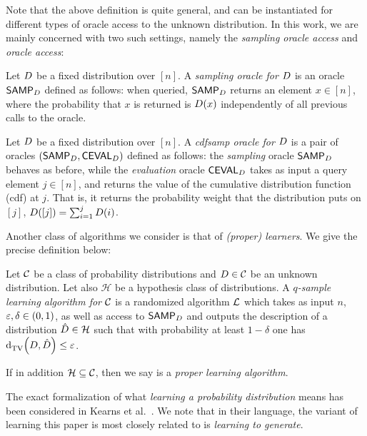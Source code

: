 Note that the above definition is quite general, and can be instantiated for different types of oracle access to the unknown distribution. In this work, we are mainly concerned with two such settings, namely the \emph{sampling oracle access} and \emph{\Cdfsamp oracle access}:
  \begin{definition}\label{def:sampling:oracle}
      Let $D$ be a fixed distribution over $[n]$. A \emph{sampling oracle for $D$} is an oracle ${\sf SAMP}_{D}$ defined as follows: when queried, ${\sf SAMP}_{D}$ returns an element $x\in[n]$, where the probability that $x$ is returned is $D(x)$ independently of all previous calls to the oracle.
  \end{definition}
    \begin{definition}\label{def:extended:oracle}
    Let $D$ be a fixed distribution over $[n]$. A \emph{cdfsamp oracle for $D$} is a pair of oracles $({\sf SAMP}_{D}, {\sf CEVAL}_{D})$ defined as follows: the \emph{sampling} oracle ${\sf SAMP}_{D}$ behaves as before, while the \emph{evaluation} oracle ${\sf CEVAL}_{D}$ takes as input a query element $j\in[n]$, and returns the value of the cumulative distribution function (cdf) at $j$. That is, it returns the probability weight that the distribution puts on $[j]$, $D([j])=\sum_{i=1}^j D(i)$.
    \end{definition}  

\noindent Another class of algorithms we consider is that of \emph{(proper) learners}. We give the precise definition below:  
\begin{definition}[Learning]
Let $\mathcal{C}$ be a class of probability distributions and $D\in \mathcal{C}$ be an unknown distribution. Let also $\mathcal{H}$ be a hypothesis class of distributions. 
A \emph{$q$-sample learning algorithm for $\mathcal{C}$} is a randomized algorithm $\mathcal{L}$ which takes as input $n$, $\varepsilon,\delta\in(0,1)$, as well as access to ${\sf SAMP}_{D}$ and  outputs the description of a distribution $\hat{D}\in \mathcal{H}$ such that with probability at least $1-\delta$ one has ${\operatorname{d}_{\textrm{TV}}^{}\!\left({D, \hat{D}}\right)}\leq \varepsilon$. 

\noindent If in addition $\mathcal{H}\subseteq \mathcal{C}$, then we say \Learner is a \emph{proper learning algorithm}.   
\end{definition}

The exact formalization of what \emph{learning a probability distribution} means has been considered in  Kearns et al.~\cite{Kearns:94}. We note that in their language, the variant of learning this paper is most closely related to is \emph{learning to generate}.
